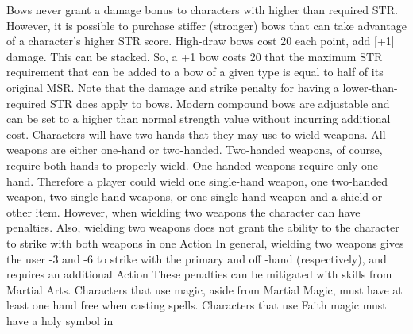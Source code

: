 \documentclass[twoside]{book}
\begin{document}
   Bows never grant a damage bonus to characters with
               higher than required STR. However, it is possible to
               purchase stiffer (stronger) bows that can take advantage
               of a character’s higher STR score. High-draw bows
               cost 20%
               each point, add [+1] damage. This can be stacked. So, a +1
               bow costs 20%
               that the maximum STR requirement that can be added to a
               bow of a given type is equal to half of its original MSR.
               Note that the damage and strike penalty for having a
               lower-than-required STR does apply to bows. Modern
               compound bows are adjustable and can be set to a higher
               than normal strength value without incurring additional
               cost.  Characters will have two hands that they may use to
               wield weapons. All weapons are either one-hand or
               two-handed. Two-handed weapons, of course, require both
               hands to properly wield. One-handed weapons require only
               one hand. Therefore a player could wield one single-hand
               weapon, one two-handed weapon, two single-hand weapons, or
               one single-hand weapon and a shield or other item.
               However, when wielding two weapons the character can have
               penalties. Also, wielding two weapons does not grant the
               ability to the character to strike with both weapons in
               one Action In general, wielding two weapons gives the user
               -3 and -6 to strike with the primary and off -hand
               (respectively), and requires an additional Action These
               penalties can be mitigated with skills from Martial Arts.
                Characters that use magic, aside from Martial Magic,
               must have at least one hand free when casting spells.
               Characters that use Faith magic must have a holy symbol in
\end{document}
